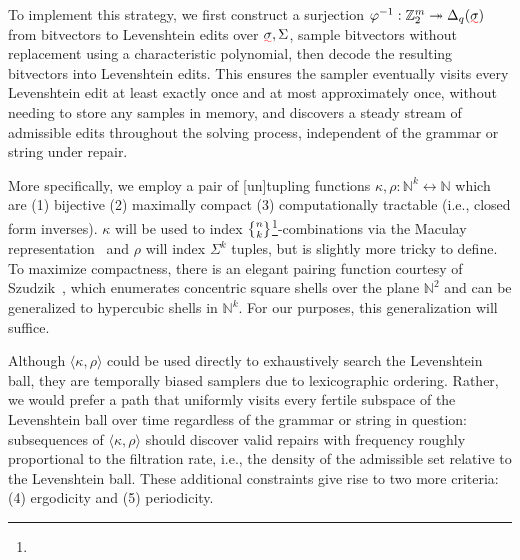 \documentclass[sigplan,review,anonymous,acmsmall]{acmart}\settopmatter{printfolios=false,printccs=false,printacmref=false}
\begin{document}
To implement this strategy, we first construct a surjection $\varphi^{-1}: \mathbb{Z}_2^m\twoheadrightarrow\Delta_{q}(\err{\sigma})$ from bitvectors to Levenshtein edits over $\err\sigma, \Sigma$, sample bitvectors without replacement using a characteristic polynomial, then decode the resulting bitvectors into Levenshtein edits. This ensures the sampler eventually visits every Levenshtein edit at least exactly once and at most approximately once, without needing to store any samples in memory, and discovers a steady stream of admissible edits throughout the solving process, independent of the grammar or string under repair.

More specifically, we employ a pair of [un]tupling functions $\kappa, \rho: \mathbb{N}^k \leftrightarrow \mathbb{N}$ which are (1) bijective (2) maximally compact (3) computationally tractable (i.e., closed form inverses). $\kappa$ will be used to index $\stirlingii{n}{k}$\footnote[2]{}-combinations via the Maculay representation~\cite{knuth2005taocp} and $\rho$ will index $\Sigma^k$ tuples, but is slightly more tricky to define. To maximize compactness, there is an elegant pairing function courtesy of Szudzik~\cite{szudzik2006elegant}, which enumerates concentric square shells over the plane $\mathbb{N}^2$ and can be generalized to hypercubic shells in $\mathbb{N}^k$. For our purposes, this generalization will suffice.

Although $\langle\kappa, \rho\rangle$ could be used directly to exhaustively search the Levenshtein ball, they are temporally biased samplers due to lexicographic ordering. Rather, we would prefer a path that uniformly visits every fertile subspace of the Levenshtein ball over time regardless of the grammar or string in question: subsequences of $\langle\kappa, \rho\rangle$ should discover valid repairs with frequency roughly proportional to the filtration rate, i.e., the density of the admissible set relative to the Levenshtein ball. These additional constraints give rise to two more criteria: (4) ergodicity and (5) periodicity.
\end{document}
